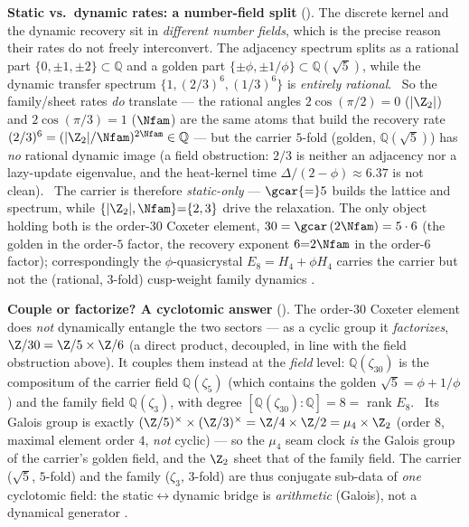 \par\smallskip\noindent\textbf{Static vs.\ dynamic rates: a number-field split}
(). The discrete kernel and the dynamic recovery sit in \emph{different number
fields}, which is the precise reason their rates do not freely interconvert. The adjacency spectrum splits as a
rational part $\{0,\pm1,\pm2\}\subset\mathbb Q$ and a golden part $\{\pm\phi,\pm1/\phi\}\subset\mathbb Q(\sqrt5)$,
while the dynamic transfer spectrum $\{1,(2/3)^6,(1/3)^6\}$ is \emph{entirely rational}. \mE\ So the family/sheet
rates \emph{do} translate --- the rational angles $2\cos(\pi/2){=}0$ ($|\Z_2|$) and $2\cos(\pi/3){=}1$ ($\Nfam$)
are the same atoms that build the recovery rate $(2/3)^6=(|\Z_2|/\Nfam)^{2\Nfam}\in\mathbb Q$ --- but the carrier
$5$-fold (golden, $\mathbb Q(\sqrt5)$) has \emph{no} rational dynamic image (a field obstruction: $2/3$ is neither
an adjacency nor a lazy-update eigenvalue, and the heat-kernel time $\Delta/(2-\phi)\approx6.37$ is not clean).
\mE\ The carrier is therefore \emph{static-only} --- $\gcar{=}5$ builds the lattice and spectrum, while
$\{|\Z_2|,\Nfam\}{=}\{2,3\}$ drive the relaxation. The only object holding both is the order-$30$ Coxeter element,
$30=\gcar\,(2\Nfam)=5\cdot6$ (the golden in the order-$5$ factor, the recovery exponent $6{=}2\Nfam$ in the
order-$6$ factor); correspondingly the $\phi$-quasicrystal $E_8=H_4{+}\phi H_4$ carries the carrier but not the
(rational, $3$-fold) cusp-weight family dynamics \mC.

\par\smallskip\noindent\textbf{Couple or factorize? A cyclotomic answer}
(). The order-$30$ Coxeter element does \emph{not} dynamically entangle the two
sectors --- as a cyclic group it \emph{factorizes}, $\Z/30=\Z/5\times\Z/6$ (a direct product, decoupled, in line
with the field obstruction above). It couples them instead at the \emph{field} level: $\mathbb Q(\zeta_{30})$ is the
compositum of the carrier field $\mathbb Q(\zeta_5)$ (which contains the golden $\sqrt5=\phi+1/\phi$) and the family
field $\mathbb Q(\zeta_3)$, with degree $[\mathbb Q(\zeta_{30}){:}\mathbb Q]=8=$ rank $E_8$. \mE\ Its Galois group is
exactly $(\Z/5)^\times\times(\Z/3)^\times=\Z/4\times\Z/2=\mu_4\times\Z_2$ (order $8$, maximal element order $4$,
\emph{not} cyclic) --- so the $\mu_4$ seam clock \emph{is} the Galois group of the carrier's golden field, and the
$\Z_2$ sheet that of the family field. The carrier ($\sqrt5$, $5$-fold) and the family ($\zeta_3$, $3$-fold) are
thus conjugate sub-data of \emph{one} cyclotomic field: the static$\leftrightarrow$dynamic bridge is
\emph{arithmetic} (Galois), not a dynamical generator \mC.

